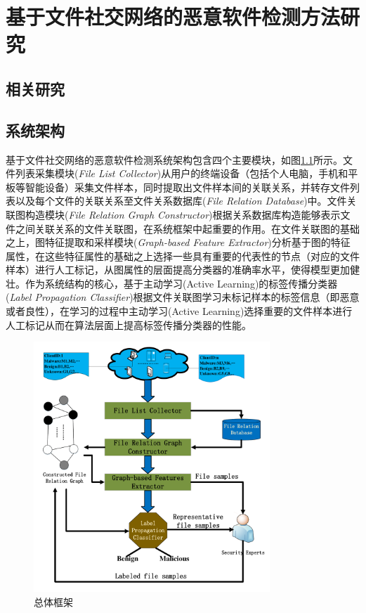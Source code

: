 \chapter{基于文件社交网络的恶意软件检测方法研究}

\section{相关研究}

\section{系统架构}
基于文件社交网络的恶意软件检测系统架构包含四个主要模块，如图\ref{fig_SysArchitecture}所示。文件列表采集模块(\textit{File List Collector})从用户的终端设备（包括个人电脑，手机和平板等智能设备）采集文件样本，同时提取出文件样本间的关联关系，并转存文件列表以及每个文件的关联关系至文件关系数据库(\textit{File Relation Database})中。文件关联图构造模块(\textit{File Relation Graph Constructor})根据关系数据库构造能够表示文件之间关联关系的文件关联图，在系统框架中起重要的作用。在文件关联图的基础之上，图特征提取和采样模块(\textit{Graph-based Feature Extractor})分析基于图的特征属性，在这些特征属性的基础之上选择一些具有重要的代表性的节点（对应的文件样本）进行人工标记，从图属性的层面提高分类器的准确率水平，使得模型更加健壮。作为系统结构的核心，基于主动学习(Active Learning)的标签传播分类器(\textit{Label Propagation Classifier})根据文件关联图学习未标记样本的标签信息（即恶意或者良性），在学习的过程中主动学习(Active Learning)选择重要的文件样本进行人工标记从而在算法层面上提高标签传播分类器的性能。

\begin{figure}[!ht]
\centering
\includegraphics[width=3.5in]{img/chap3/SystemArchitecture.pdf}
\caption{总体框架}
\label{fig_SysArchitecture}
\end{figure}
